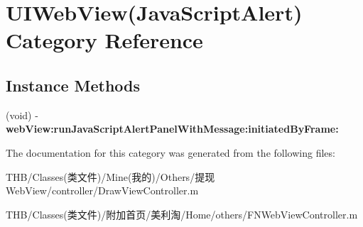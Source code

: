 \hypertarget{category_u_i_web_view_07_java_script_alert_08}{}\section{U\+I\+Web\+View(Java\+Script\+Alert) Category Reference}
\label{category_u_i_web_view_07_java_script_alert_08}
\subsection*{Instance Methods}
\begin{DoxyCompactItemize}
\item 
\mbox{\label{category_u_i_web_view_07_java_script_alert_08_acce10fd2d9d983a4ec26cb4b5d0b0684}} 
(void) -\/ {\bfseries web\+View\+:run\+Java\+Script\+Alert\+Panel\+With\+Message\+:initiated\+By\+Frame\+:}
\end{DoxyCompactItemize}


The documentation for this category was generated from the following files\+:\begin{DoxyCompactItemize}
\item 
T\+H\+B/\+Classes(类文件)/\+Mine(我的)/\+Others/提现\+Web\+View/controller/Draw\+View\+Controller.\+m\item 
T\+H\+B/\+Classes(类文件)/附加首页/美利淘/\+Home/others/F\+N\+Web\+View\+Controller.\+m\end{DoxyCompactItemize}
